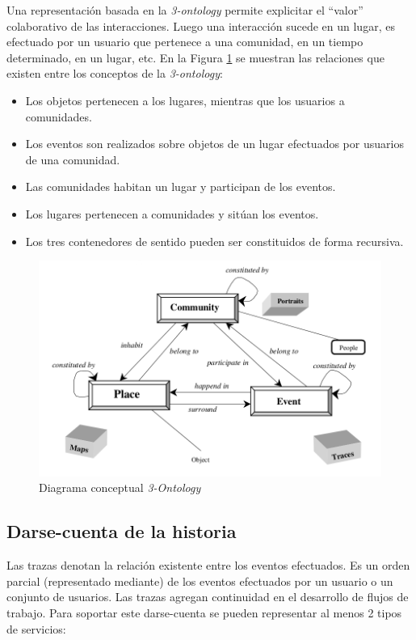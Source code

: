 Una representación basada en la \textit{3-ontology} permite explicitar el ``valor'' colaborativo de las interacciones. Luego una interacción sucede en un lugar, es efectuado por un usuario que pertenece a una comunidad, en un tiempo determinado, en un lugar, etc. En la Figura \ref{fig:diagram3ontology} se muestran las relaciones que existen entre los conceptos de la \textit{3-ontology}:
\begin{itemize}
 \item Los objetos pertenecen a los lugares, mientras que los usuarios a comunidades. 
 \item Los eventos son realizados sobre objetos de un lugar efectuados por usuarios de una comunidad.
 \item Las comunidades habitan un lugar y participan de los eventos.
 \item Los lugares pertenecen a comunidades y sitúan los eventos.
 \item Los tres contenedores de sentido pueden ser constituidos de forma recursiva.
\end{itemize}


\begin{figure}[tp]
\centering
\includegraphics[scale=.5]{images/locus3ontology.png}
\caption{Diagrama conceptual \textit{3-Ontology} \citep{Leiva:2002}}
\label{fig:diagram3ontology}
\end{figure}

\subsection{Darse-cuenta de la historia}

Las trazas denotan la relación existente entre los eventos efectuados. Es un orden parcial (representado mediante) de los eventos efectuados por un usuario o un conjunto de usuarios. Las trazas agregan continuidad en el desarrollo de flujos de trabajo. Para soportar este darse-cuenta se pueden representar al menos 2 tipos de servicios:

